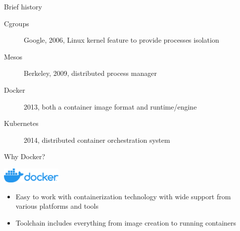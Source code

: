 \documentclass{beamer}
\begin{document}
\begin{frame}{Brief history}
  \begin{description}
    \item[Cgroups] Google, 2006, Linux kernel feature to provide processes
      isolation
    \item[Mesos] Berkeley, 2009, distributed process manager
    \item[Docker] 2013, both a container image format and runtime/engine
    \item[Kubernetes] 2014, distributed container orchestration system
  \end{description}
\end{frame}

\begin{frame}{Why Docker?}
  \begin{center}
    \includegraphics[height=0.75cm]{assets/dockerlogo.png}
  \end{center}
  \begin{itemize}
    \item Easy to work with containerization technology with wide support from
      various platforms and tools
    \item Toolchain includes everything from image creation to running
      containers
  \end{itemize}
\end{frame}
\end{document}
